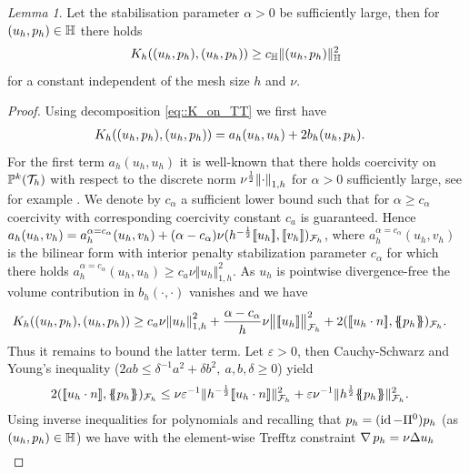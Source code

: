 \documentclass[pdflatex,sn-mathphys,Numbered]{sn-jnl}%
\theoremstyle{remark}%
\newtheorem{lemma}[theorem]{Lemma}
\theoremstyle{definition}%
\begin{document}
\begin{lemma}\label{lem:coercivity} Let the stabilisation parameter
  $\alpha>0$ be sufficiently large, then for $(u_h,p_h) \in \mathbb{H}$ there
  holds
  \begin{equation}
    K_h((u_h,p_h),(u_h,p_h)) \geq c_{\mathbb{H}} \Vert (u_h,p_h) \Vert_{\mathbb{H}}^2
  \end{equation}
  for a constant independent of the mesh size $h$ and $\nu$.
\end{lemma}
\begin{proof}
Using decomposition \eqref{eq::K_on_TT} we first have
  \begin{align*}
    K_h((u_h,p_h),(u_h,p_h)) & = a_h(u_h,u_h) + 2 b_h(u_h,p_h).
    \end{align*}
For the first term $a_h(u_h,u_h)$ it is well-known that there holds coercivity on $\mathbb{P}^k({\mathcal{T}_h})$ with respect to the discrete norm $\nu^{\frac12} \norm{\cdot}_{1,h}$ for $\alpha>0$ sufficiently large, see for example \cite{arnold2002unified,di2011mathematical}. We denote by $c_\alpha$ a sufficient lower bound such that for $\alpha\geq c_\alpha$ coercivity with corresponding coercivity constant $c_a$ is guaranteed.
Hence $a_h(u_h,v_h) = a_h^{\alpha=c_\alpha}(u_h,v_h) + (\alpha - c_\alpha) \nu (h^{-\frac12}[\![u_h]\!],[\![v_h]\!])_{{\mathcal{F}_h}}$, where $a_h^{\alpha=c_\alpha}(u_h,v_h)$ is the bilinear form with interior penalty stabilization parameter $c_\alpha$ for which there holds
$a_h^{\alpha=c_\alpha}(u_h,u_h) \geq c_a \nu \Vert u_h \Vert_{1,h}^2$.
As $u_h$ is pointwise divergence-free the volume contribution in $b_h(\cdot,\cdot)$ vanishes and we have
  \begin{align*}
    \Kh((u_h,p_h),(u_h,p_h)) & \geq c_{a} \nu \norm{u_h}_{1,h}^2 + \frac{\alpha - c_\alpha}{h} \nu \norm{\jmp{u_h}}_{\Fh}^2 + 2 (\jmp{u_h \cdot n}, \avg{p_h})_{\Fh}.
  \end{align*}
  Thus it remains to bound the latter term. Let $\varepsilon > 0$, then Cauchy-Schwarz
  and Young's inequality ($2 a b \leq \delta^{-1} a^2 + \delta
  b^2,~a,b,\delta \geq 0$) yield
  \begin{align*}
    2 (\jmp{u_h \cdot n}, \avg{p_h})_{\Fh} & \leq \nu \varepsilon^{-1} \Vert{h^{-\frac12}\jmp{u_h \cdot n}}\Vert_{\Fh}^2 + \varepsilon \nu^{-1} \nrm{h^{\frac12}\avg{p_h}}_{\Fh}^2.
  \end{align*}
  Using inverse inequalities for polynomials and recalling that $p_h =
  (\operatorname{id}-\Pi^0)p_h$ (as $(u_h,p_h)\in \mathbb{H}$) we have with the
  element-wise Trefftz constraint $\operatorname{\nabla} p_h = \nu \Delta u_h$ 
  \begin{align*}

\end{align*}
\end{proof}
\end{document}
